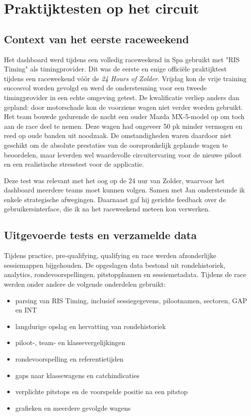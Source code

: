 
\chapter{Praktijktesten op het circuit}
\label{chap:spa}

\section{Context van het eerste raceweekend}
Het dashboard werd tijdens een volledig raceweekend in Spa gebruikt met "RIS Timing" als timingprovider. Dit was de
eerste en enige officiële praktijktest tijdens een raceweekend vóór de \emph{24 Hours of Zolder}.
Vrijdag kon de
vrije training succesvol worden gevolgd en werd de ondersteuning voor een tweede timingprovider in
een echte omgeving getest. De kwalificatie verliep anders dan gepland: door motorschade kon de
voorziene wagen niet verder worden gebruikt. Het team bouwde gedurende de nacht een ouder Mazda
MX-5-model op om toch aan de race deel te nemen. Deze wagen had ongeveer 50 pk minder vermogen en
reed op oude banden uit noodzaak. De omstandigheden waren daardoor niet geschikt om de absolute prestaties van
de oorspronkelijk geplande wagen te beoordelen, maar leverden wel waardevolle circuitervaring voor
de nieuwe piloot en een realistische stresstest voor de applicatie.

Deze test was relevant met het oog op de 24 uur van Zolder, waarvoor het dashboard meerdere teams
moet kunnen volgen. Samen met Jan ondersteunde ik enkele strategische afwegingen. Daarnaast gaf hij
gerichte feedback over de gebruikersinterface, die ik na het raceweekend meteen kon verwerken.

\section{Uitgevoerde tests en verzamelde data}
Tijdens practice, pre-qualifying, qualifying en race werden afzonderlijke sessiemappen bijgehouden. De opgeslagen data bestond uit rondehistoriek, analytics,
rondevoorspellingen, pitstopplannen en sessiemetadata. Tijdens de race werden onder andere de
volgende onderdelen gebruikt:

\begin{itemize}
  \item parsing van RIS Timing, inclusief sessiegegevens, pilootnamen, sectoren, GAP en INT
  \item langdurige opslag en hervatting van rondehistoriek
  \item piloot-, team- en klassevergelijkingen
  \item rondevoorspelling en referentietijden
  \item gaps naar klassewagens en catchindicaties
  \item verplichte pitstops en de voorspelde positie na een pitstop
  \item grafieken en meerdere gevolgde wagens
\end{itemize}

